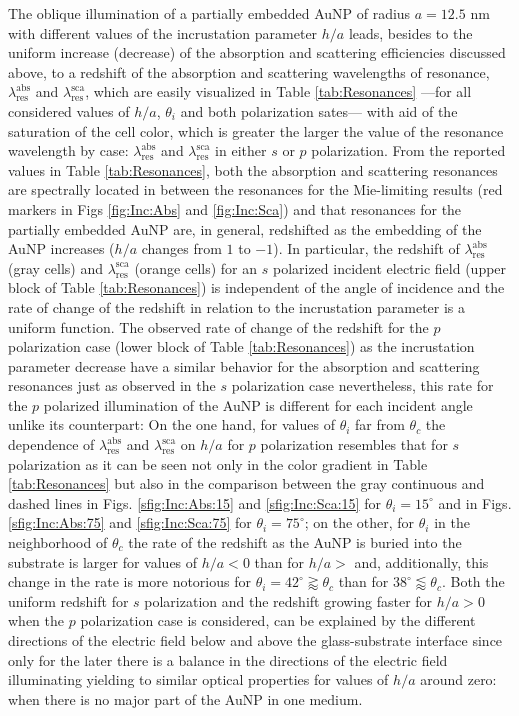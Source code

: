 The oblique illumination of a partially embedded AuNP of radius $a=12.5$ nm with different values of the incrustation parameter $h/a$ leads, besides to the uniform increase (decrease) of the absorption and scattering efficiencies discussed above, to a redshift of the absorption and scattering wavelengths of resonance, $\lambda_\text{res}^\text{abs}$ and $\lambda_\text{res}^\text{sca}$, which are easily visualized in Table \ref{tab:Resonances} ---for all considered values of $h/a$, $\theta_i$ and both polarization sates--- with aid of the saturation of the cell color, which is greater the larger the value of the resonance wavelength by case: $\lambda_\text{res}^\text{abs}$ and $\lambda_\text{res}^\text{sca}$ in either $s$ or $p$ polarization. From the reported values in Table \ref{tab:Resonances}, both the absorption and scattering resonances are spectrally located in between the resonances for the Mie-limiting results (red markers in Figs \ref{fig:Inc:Abs} and \ref{fig:Inc:Sca}) and that resonances for the partially embedded AuNP are, in general, redshifted as the embedding of the AuNP increases ($h/a$ changes from $1$ to $-1$). In particular, the redshift of $\lambda_\text{res}^\text{abs}$ (gray cells) and $\lambda_\text{res}^\text{sca}$ (orange cells) for an $s$ polarized incident electric field (upper block of Table \ref{tab:Resonances}) is independent of the angle of incidence and the rate of change of the redshift in relation to the incrustation parameter is a uniform function. The observed rate of change of the redshift for the $p$ polarization case (lower block of Table \ref{tab:Resonances}) as the incrustation parameter decrease have a similar behavior for the absorption and scattering resonances just as observed in the $s$ polarization case nevertheless, this rate for the $p$ polarized illumination of the AuNP is different for each incident angle unlike its counterpart: On the one hand, for values of $\theta_i$ far from $\theta_c$ the dependence of  $\lambda_\text{res}^\text{abs}$ and $\lambda_\text{res}^\text{sca}$ on $h/a$ for $p$ polarization resembles that for $s$ polarization as it can be seen not only in the color gradient in Table \ref{tab:Resonances} but also in the comparison between the gray continuous and dashed lines in Figs. \ref{sfig:Inc:Abs:15} and \ref{sfig:Inc:Sca:15} for $\theta_i = 15^\circ$ and in Figs. \ref{sfig:Inc:Abs:75} and \ref{sfig:Inc:Sca:75} for $\theta_i = 75^\circ$; on the other, for $\theta_i$ in the neighborhood of $\theta_c$ the rate of the redshift as the AuNP is buried into the substrate is larger for values of $h/a<0$ than for $h/a>$ and, additionally, this change in the rate is more notorious for $\theta_i = 42^\circ\gtrapprox \theta_c$ than for $38^\circ\lessapprox \theta_c$. Both the uniform redshift for $s$ polarization and the redshift growing faster for $h/a>0$ when the $p$ polarization case is considered, can be explained by the different directions of the electric field below and above the glass-substrate interface since only for the later there is a balance in the directions of the electric field illuminating yielding to similar optical properties for values of $h/a$  around zero: when there is no major part of the AuNP in one medium.

